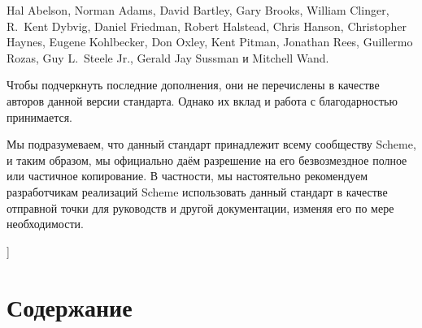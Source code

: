 \documentclass[twoside,twocolumn]{algol60}
\begin{document}
{{%
Hal Abelson, Norman Adams, David Bartley, Gary Brooks, William
Clinger, R.\ Kent Dybvig, Daniel Friedman, Robert Halstead, Chris
Hanson, Christopher Haynes, Eugene Kohlbecker, Don Oxley, Kent Pitman,
Jonathan Rees, Guillermo Rozas, Guy L.\ Steele Jr., Gerald Jay Sussman и
Mitchell Wand.

Чтобы подчеркнуть последние дополнения, они не перечислены в качестве авторов данной версии
стандарта. Однако их вклад и работа с благодарностью принимается.

\medskip

Мы подразумеваем, что данный стандарт принадлежит всему сообществу Scheme, и таким образом, мы
официально даём разрешение на его безвозмездное полное или частичное копирование. В частности,
мы настоятельно рекомендуем разработчикам реализаций Scheme использовать данный стандарт в
качестве отправной точки для руководств и другой документации, изменяя его по мере
необходимости.
}

\bigskip


}]

\texonly\clearpage\endtexonly

\chapter*{Содержание}
\addvspace{3.5pt}                  %
\renewcommand{\tocshrink}{-4.0pt}  %
{
\tableofcontents
}

\vfill
\eject
\end{document}
